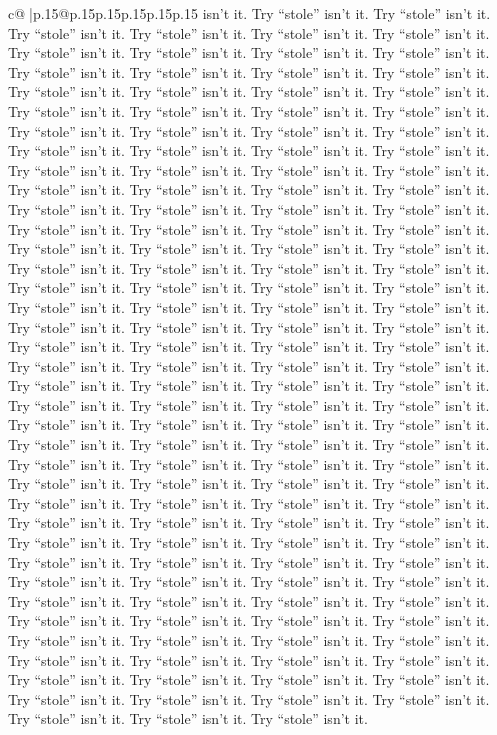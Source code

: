 \documentclass{article}
\begin{document}
{\begin{supertabular}{c@{$\;$}|p{.15\linewidth}@{}p{.15\linewidth}p{.15\linewidth}p{.15\linewidth}p{.15\linewidth}p{.15\linewidth}}
{{{isn’t it. Try “stole” isn’t it. Try “stole” isn’t it. Try “stole” isn’t it. Try “stole” isn’t it. Try “stole” isn’t it. Try “stole” isn’t it. Try “stole” isn’t it. Try “stole” isn’t it. Try “stole” isn’t it. Try “stole” isn’t it. Try “stole” isn’t it. Try “stole” isn’t it. Try “stole” isn’t it. Try “stole” isn’t it. Try “stole” isn’t it. Try “stole” isn’t it. Try “stole” isn’t it. Try “stole” isn’t it. Try “stole” isn’t it. Try “stole” isn’t it. Try “stole” isn’t it. Try “stole” isn’t it. Try “stole” isn’t it. Try “stole” isn’t it. Try “stole” isn’t it. Try “stole” isn’t it. Try “stole” isn’t it. Try “stole” isn’t it. Try “stole” isn’t it. Try “stole” isn’t it. Try “stole” isn’t it. Try “stole” isn’t it. Try “stole” isn’t it. Try “stole” isn’t it. Try “stole” isn’t it. Try “stole” isn’t it. Try “stole” isn’t it. Try “stole” isn’t it. Try “stole” isn’t it. Try “stole” isn’t it. Try “stole” isn’t it. Try “stole” isn’t it. Try “stole” isn’t it. Try “stole” isn’t it. Try “stole” isn’t it. Try “stole” isn’t it. Try “stole” isn’t it. Try “stole” isn’t it. Try “stole” isn’t it. Try “stole” isn’t it. Try “stole” isn’t it. Try “stole” isn’t it. Try “stole” isn’t it. Try “stole” isn’t it. Try “stole” isn’t it. Try “stole” isn’t it. Try “stole” isn’t it. Try “stole” isn’t it. Try “stole” isn’t it. Try “stole” isn’t it. Try “stole” isn’t it. Try “stole” isn’t it. Try “stole” isn’t it. Try “stole” isn’t it. Try “stole” isn’t it. Try “stole” isn’t it. Try “stole” isn’t it. Try “stole” isn’t it. Try “stole” isn’t it. Try “stole” isn’t it. Try “stole” isn’t it. Try “stole” isn’t it. Try “stole” isn’t it. Try “stole” isn’t it. Try “stole” isn’t it. Try “stole” isn’t it. Try “stole” isn’t it. Try “stole” isn’t it. Try “stole” isn’t it. Try “stole” isn’t it. Try “stole” isn’t it. Try “stole” isn’t it. Try “stole” isn’t it. Try “stole” isn’t it. Try “stole” isn’t it. Try “stole” isn’t it. Try “stole” isn’t it. Try “stole” isn’t it. Try “stole” isn’t it. Try “stole” isn’t it. Try “stole” isn’t it. Try “stole” isn’t it. Try “stole” isn’t it. Try “stole” isn’t it. Try “stole” isn’t it. Try “stole” isn’t it. Try “stole” isn’t it. Try “stole” isn’t it. Try “stole” isn’t it. Try “stole” isn’t it. Try “stole” isn’t it. Try “stole” isn’t it. Try “stole” isn’t it. Try “stole” isn’t it. Try “stole” isn’t it. Try “stole” isn’t it. Try “stole” isn’t it. Try “stole” isn’t it. Try “stole” isn’t it. Try “stole” isn’t it. Try “stole” isn’t it. Try “stole” isn’t it. Try “stole” isn’t it. Try “stole” isn’t it. Try “stole” isn’t it. Try “stole” isn’t it. Try “stole” isn’t it. Try “stole” isn’t it. Try “stole” isn’t it. Try “stole” isn’t it. Try “stole” isn’t it. Try “stole” isn’t it. Try “stole” isn’t it. Try “stole” isn’t it. Try “stole” isn’t it. Try “stole” isn’t it. Try “stole” isn’t it. Try “stole” isn’t it. Try “stole” isn’t it. Try “stole” isn’t it. Try “stole” isn’t it. Try “stole” isn’t it. Try “stole” isn’t it. Try “stole” isn’t it. Try “stole” isn’t it. Try “stole” isn’t it. Try “stole” isn’t it. Try “stole” isn’t it. Try “stole” isn’t it. Try “stole” isn’t it. Try “stole” isn’t it. Try “stole” isn’t it. Try “stole” isn’t it. Try “stole” isn’t it. Try “stole” isn’t it. }}}
\end{supertabular}}
\end{document}
